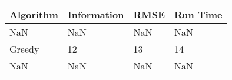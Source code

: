 \begin{tabular}{llll}
\toprule
Algorithm & Information & RMSE & Run Time \\
\midrule
NaN & NaN & NaN & NaN \\
Greedy & 12 & 13 & 14 \\
NaN & NaN & NaN & NaN \\
\bottomrule
\end{tabular}
